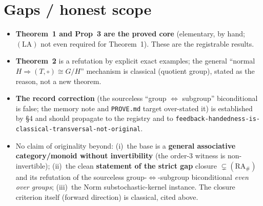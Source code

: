 \documentclass[11pt]{article}
\theoremstyle{plain}
\theoremstyle{definition}
\theoremstyle{remark}
\begin{document}
\section{Gaps / honest scope}

\begin{itemize}[leftmargin=1.6em]
\item \textbf{Theorem~1 and Prop~3 are the proved core} (elementary, by hand; $(\mathrm{LA})$ not
  even required for Theorem~1). These are the registrable results.
\item \textbf{Theorem~2} is a refutation by explicit exact examples; the general ``normal $H
  \Rightarrow (T,\circ)\cong G/H$'' mechanism is classical (quotient group), stated as the reason,
  not a new theorem.
\item \textbf{The record correction} (the sourceless ``group $\iff$ subgroup'' biconditional is
  false; the memory note and \texttt{PROVE.md} target over-stated it) is established by \S4 and
  should propagate to the registry and to
  \texttt{feedback-handedness-is-classical-transversal-not-original}.
\item No claim of originality beyond: (i)~the base is a \textbf{general associative category/monoid
  without invertibility} (the order-3 witness is non-invertible); (ii)~the clean \textbf{statement
  of the strict gap} closure $\subsetneq (\mathrm{RA}_\#)$ and its refutation of the sourceless
  group-$\iff$-subgroup biconditional \emph{even over groups}; (iii)~the $\mathrm{Norm}$
  substochastic-kernel instance.
  The closure criterion itself (forward direction) is classical, cited above.
\end{itemize}
\end{document}
